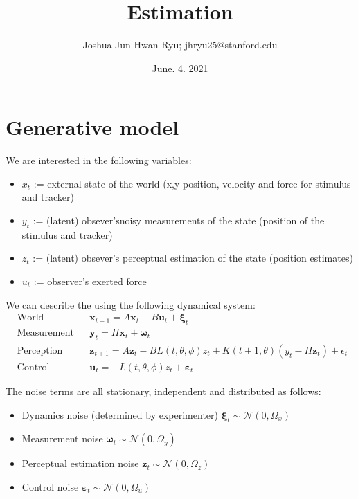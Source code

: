\documentclass[11pt, reqno]{article}
\title{Estimation }
\author{Joshua Jun Hwan Ryu; jhryu25@stanford.edu}
\date{June. 4. 2021}
\numberwithin{equation}{section}
\begin{document}
\maketitle

\section{Generative model}

We are interested in the following variables: 
\begin{itemize}
\item $x_t$ := external state of the world (x,y position, velocity and force for stimulus and tracker)
\item $y_t$ := (latent) obsever'snoisy measurements of the state (position of the stimulus and tracker)
\item $z_t$ := (latent) obsever's perceptual estimation of the state (position estimates)
\item $u_t$ := observer's exerted force
\end{itemize}

\noindent We can describe the using the following dynamical system:
\begin{align*}
&\text{World} &&\bm{x}_{t+1} = A\bm{x}_t + B\bm{u}_{t} + \bm{\xi}_t &\\
&\text{Measurement} &&\bm{y}_{t} = H\bm{x}_t + \bm{\omega}_t &\\
&\text{Perception} &&\bm{z}_{t+1} = A\bm{z}_{t} - BL(t,\theta, \phi)z_{t}+ K(t+1,\theta) (y_t - H\bm{z}_{t})+ \epsilon_t &\\
&\text{Control} &&\bm{u}_{t} = - L(t,\theta, \phi)z_{t} + \bm{\varepsilon}_t &
\end{align*}

\noindent The noise terms are all stationary, independent and distributed as follows:
\begin{itemize}
\item Dynamics noise (determined by experimenter) $\bm{\xi}_t  \sim \mathcal{N}(0, \Omega_x)$ 
\item Measurement noise $\bm{\omega}_t  \sim \mathcal{N}(0, \Omega_y)$ 
\item Perceptual estimation noise $\bm{z}_t  \sim \mathcal{N}(0, \Omega_z)$ 
\item Control noise $\bm{\varepsilon}_t  \sim \mathcal{N}(0, \Omega_u)$ 
\end{itemize}
\end{document}
